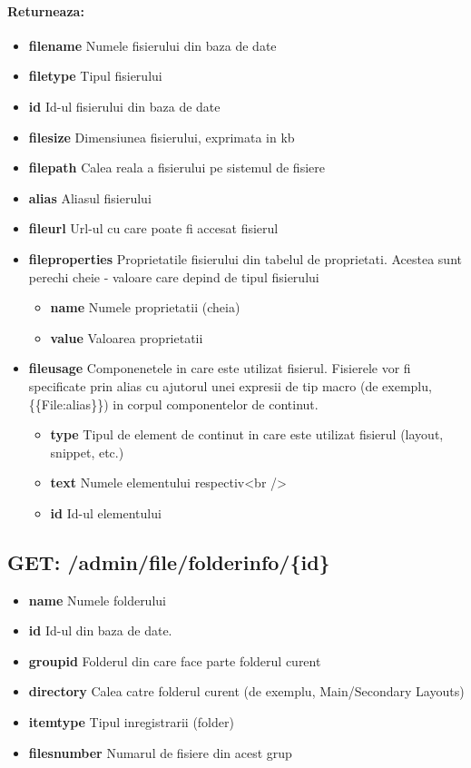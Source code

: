 \paragraph{Returneaza:}
\begin{itemize}
\item \textbf{filename}
 Numele fisierului din baza de date
\item \textbf{filetype}
 Tipul fisierului
\item \textbf{id}
 Id-ul fisierului din baza de date
\item \textbf{filesize}
 Dimensiunea fisierului, exprimata in kb
\item \textbf{filepath}
 Calea reala a fisierului pe sistemul de fisiere
\item \textbf{alias}
 Aliasul fisierului
\item \textbf{fileurl}
 Url-ul cu care poate fi accesat fisierul
\item\textbf{fileproperties}
 Proprietatile fisierului din tabelul de proprietati. Acestea sunt perechi cheie - valoare care depind de tipul fisierului \begin{itemize}
\item \textbf{name}
 Numele proprietatii (cheia)
\item \textbf{value}
 Valoarea proprietatii
 \end{itemize}
\item\textbf{fileusage}
 Componenetele in care este utilizat fisierul. Fisierele vor fi specificate prin alias cu ajutorul unei expresii de tip macro (de exemplu, \{\{File:alias\}\}) in corpul componentelor de continut. \begin{itemize}
\item \textbf{type}
 Tipul de element de continut in care este utilizat fisierul (layout, snippet, etc.)
\item \textbf{text}
 Numele elementului respectiv<br />
\item \textbf{id}
 Id-ul elementului
 \end{itemize}
 \end{itemize}
 \subsection*{GET: /admin/file/folderinfo/\{id\}}

\begin{itemize}
\item \textbf{name}
 Numele folderului
\item \textbf{id}
 Id-ul din baza de date. 
\item \textbf{groupid}
 Folderul din care face parte folderul curent 
\item \textbf{directory}
 Calea catre folderul curent (de exemplu, Main/Secondary Layouts)
\item \textbf{itemtype}
 Tipul inregistrarii (folder)
\item \textbf{filesnumber}
 Numarul de fisiere din acest grup
 \end{itemize}
